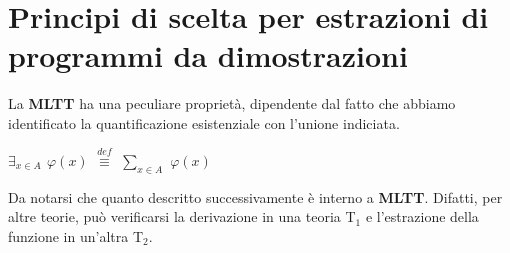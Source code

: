 \section{Principi di scelta per estrazioni di programmi da dimostrazioni}
\label{sec:principi-di-scelta-per-estrazioni-di-programmi-da-dimostrazioni}
La \textbf{MLTT} ha una peculiare propriet\`a, dipendente dal fatto che abbiamo identificato la quantificazione esistenziale con l'unione indiciata.
\begin{center}\textbf{$\exists_{x \in A}$ $\varphi(x)$ }${\overset{\mathit{def}}{\equiv}}$ $\sum\limits_{x \in A}$ $\varphi(x)$\end{center}
\noindent
Da notarsi che quanto descritto successivamente \`e interno a \textbf{MLTT}. Difatti, per altre teorie, pu\`o verificarsi la derivazione in una teoria T$_1$ e l'estrazione della funzione in un'altra T$_2$.


